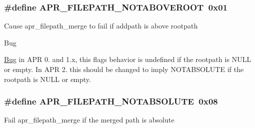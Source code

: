 \subsubsection[{\texorpdfstring{A\+P\+R\+\_\+\+F\+I\+L\+E\+P\+A\+T\+H\+\_\+\+N\+O\+T\+A\+B\+O\+V\+E\+R\+O\+OT}{APR_FILEPATH_NOTABOVEROOT}}]{\setlength{\rightskip}{0pt plus 5cm}\#define A\+P\+R\+\_\+\+F\+I\+L\+E\+P\+A\+T\+H\+\_\+\+N\+O\+T\+A\+B\+O\+V\+E\+R\+O\+OT~0x01}\hypertarget{group__apr__filepath_gabb57ce7b23caf512d7f64b92a662ab3d}{}\label{group__apr__filepath_gabb57ce7b23caf512d7f64b92a662ab3d}
Cause apr\+\_\+filepath\+\_\+merge to fail if addpath is above rootpath \begin{DoxyRefDesc}{Bug}
\item[\hyperlink{bug__bug000002}{Bug}]in A\+PR 0. and 1.\+x, this flag\textquotesingle{}s behavior is undefined if the rootpath is N\+U\+LL or empty. In A\+PR 2. this should be changed to imply N\+O\+T\+A\+B\+S\+O\+L\+U\+TE if the rootpath is N\+U\+LL or empty. \end{DoxyRefDesc}
\subsubsection[{\texorpdfstring{A\+P\+R\+\_\+\+F\+I\+L\+E\+P\+A\+T\+H\+\_\+\+N\+O\+T\+A\+B\+S\+O\+L\+U\+TE}{APR_FILEPATH_NOTABSOLUTE}}]{\setlength{\rightskip}{0pt plus 5cm}\#define A\+P\+R\+\_\+\+F\+I\+L\+E\+P\+A\+T\+H\+\_\+\+N\+O\+T\+A\+B\+S\+O\+L\+U\+TE~0x08}\hypertarget{group__apr__filepath_gaac75b8e9fd5c248b52ac36a1fd6b7f98}{}\label{group__apr__filepath_gaac75b8e9fd5c248b52ac36a1fd6b7f98}
Fail apr\+\_\+filepath\+\_\+merge if the merged path is absolute 
